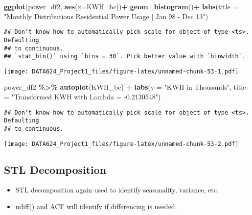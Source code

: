 \documentclass[
]{article}
\newenvironment{Shaded}{\begin{snugshade}}{\end{snugshade}}
\newcommand{\AttributeTok}[1]{\textcolor[rgb]{0.13,0.29,0.53}{#1}}
\newcommand{\FunctionTok}[1]{\textcolor[rgb]{0.13,0.29,0.53}{\textbf{#1}}}
\newcommand{\NormalTok}[1]{#1}
\newcommand{\SpecialCharTok}[1]{\textcolor[rgb]{0.81,0.36,0.00}{\textbf{#1}}}
\newcommand{\StringTok}[1]{\textcolor[rgb]{0.31,0.60,0.02}{#1}}
\providecommand{\tightlist}{%
  \setlength{\itemsep}{0pt}\setlength{\parskip}{0pt}}
\begin{document}
\begin{Shaded}
\begin{Highlighting}[]
\FunctionTok{ggplot}\NormalTok{(power\_df2, }\FunctionTok{aes}\NormalTok{(}\AttributeTok{x=}\NormalTok{KWH\_bc))}\SpecialCharTok{+}
  \FunctionTok{geom\_histogram}\NormalTok{()}\SpecialCharTok{+}
  \FunctionTok{labs}\NormalTok{(}\AttributeTok{title =} \StringTok{"Monthly Distributions Residential Power Usage | Jan \textquotesingle{}98 {-} Dec \textquotesingle{}13"}\NormalTok{)}
\end{Highlighting}
\end{Shaded}

\begin{verbatim}
## Don't know how to automatically pick scale for object of type <ts>. Defaulting
## to continuous.
## `stat_bin()` using `bins = 30`. Pick better value with `binwidth`.
\end{verbatim}

\texttt{[image: DATA624\_Project1\_files/figure-latex/unnamed-chunk-53-1.pdf]}

\begin{Shaded}
\begin{Highlighting}[]
\NormalTok{power\_df2 }\SpecialCharTok{\%\textgreater{}\%} 
  \FunctionTok{autoplot}\NormalTok{(KWH\_bc) }\SpecialCharTok{+}
  \FunctionTok{labs}\NormalTok{(}\AttributeTok{y =} \StringTok{"KWH in Thousands"}\NormalTok{,}
       \AttributeTok{title =} \StringTok{"Transformed KWH with Lambda = {-}0.2130548"}\NormalTok{)}
\end{Highlighting}
\end{Shaded}

\begin{verbatim}
## Don't know how to automatically pick scale for object of type <ts>. Defaulting
## to continuous.
\end{verbatim}

\texttt{[image: DATA624\_Project1\_files/figure-latex/unnamed-chunk-53-2.pdf]}

\hypertarget{stl-decomposition-3}{%
\subsection{STL Decomposition}\label{stl-decomposition-3}}

\begin{itemize}
\tightlist
\item
  STL decomposition again used to identify seasonality, variance, etc.
\item
  ndiff() and ACF will identify if differencing is needed.
\end{itemize}
\end{document}
